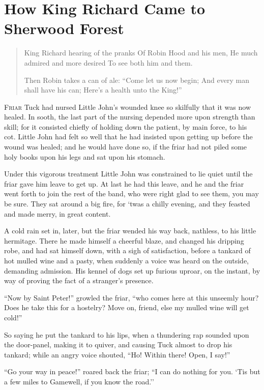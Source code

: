 \chapter{How King Richard Came to Sherwood Forest}

\begin{quote}
King Richard hearing of the pranks
Of Robin Hood and his men,
He much admired and more desired
To see both him and them.

Then Robin takes a can of ale:
“Come let us now begin;
And every man shall have his can;
Here’s a health unto the King!”
\end{quote}

\lettrine{F}{riar} Tuck had nursed Little John's wounded knee so skilfully that it
was now healed. In sooth, the last part of the nursing depended more
upon strength than skill; for it consisted chiefly of holding down the
patient, by main force, to his cot. Little John had felt so well that he
had insisted upon getting up before the wound was healed; and he would
have done so, if the friar had not piled some holy books upon his legs
and sat upon his stomach.

Under this vigorous treatment Little John was constrained to lie quiet
until the friar gave him leave to get up. At last he had this leave, and
he and the friar went forth to join the rest of the band, who were right
glad to see them, you may be sure. They sat around a big fire, for `twas
a chilly evening, and they feasted and made merry, in great content.

A cold rain set in, later, but the friar wended his way back, nathless,
to his little hermitage. There he made himself a cheerful blaze, and
changed his dripping robe, and had sat himself down, with a sigh of
satisfaction, before a tankard of hot mulled wine and a pasty, when
suddenly a voice was heard on the outside, demanding admission. His
kennel of dogs set up furious uproar, on the instant, by way of proving
the fact of a stranger's presence.

``Now by Saint Peter!'' growled the friar, ``who comes here at this
unseemly hour? Does he take this for a hostelry? Move on, friend, else
my mulled wine will get cold!''

So saying he put the tankard to his lips, when a thundering rap sounded
upon the door-panel, making it to quiver, and causing Tuck almost to
drop his tankard; while an angry voice shouted, ``Ho! Within there!
Open, I say!''

``Go your way in peace!'' roared back the friar; ``I can do nothing for
you. `Tis but a few miles to Gamewell, if you know the road.''

